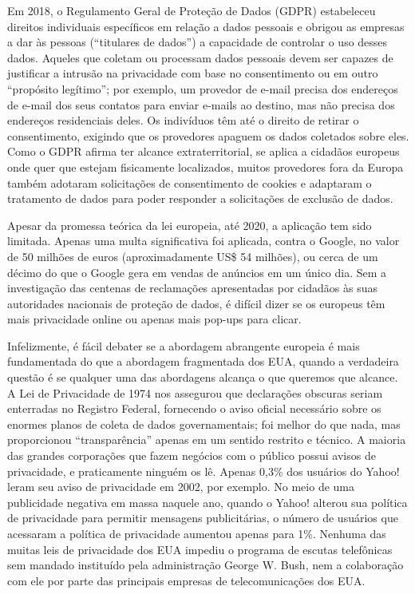 \documentclass{book}
\begin{document}
Em 2018, o Regulamento Geral de Proteção de Dados (GDPR) estabeleceu direitos
individuais específicos em relação a dados pessoais e obrigou as empresas a dar às
pessoas (``titulares de dados'') a capacidade de controlar o uso desses dados.
Aqueles que coletam ou processam dados pessoais devem ser capazes de justificar a
intrusão na privacidade com base no consentimento ou em outro ``propósito legítimo'';
por exemplo, um provedor de e-mail precisa dos endereços de e-mail dos seus contatos
para enviar e-mails ao destino, mas não precisa dos endereços residenciais deles.
Os indivíduos têm até o direito de retirar o consentimento, exigindo que os
provedores apaguem os dados coletados sobre eles. Como o GDPR afirma ter alcance
extraterritorial, se aplica a cidadãos europeus onde quer que estejam fisicamente
localizados, muitos provedores fora da Europa também adotaram solicitações de
consentimento de cookies e adaptaram o tratamento de dados para poder responder
a solicitações de exclusão de dados.

Apesar da promessa teórica da lei europeia, até 2020, a aplicação tem sido
limitada. Apenas uma multa significativa foi aplicada, contra o Google, no valor
de 50 milhões de euros (aproximadamente US\$ 54 milhões), ou cerca de um décimo
do que o Google gera em vendas de anúncios em um único dia. Sem a investigação
das centenas de reclamações apresentadas por cidadãos às suas autoridades
nacionais de proteção de dados, é difícil dizer se os europeus têm mais 
privacidade online ou apenas mais pop-ups para clicar.

Infelizmente, é fácil debater se a abordagem abrangente europeia é mais
fundamentada do que a abordagem fragmentada dos EUA, quando a verdadeira questão
é se qualquer uma das abordagens alcança o que queremos que alcance. A Lei de
Privacidade de 1974 nos assegurou que declarações obscuras seriam enterradas 
no Registro Federal, fornecendo o aviso oficial necessário sobre os enormes
planos de coleta de dados governamentais; foi melhor do que nada, mas proporcionou
``transparência'' apenas em um sentido restrito e técnico. A maioria das grandes
corporações que fazem negócios com o público possui avisos de privacidade, e
praticamente ninguém os lê. Apenas 0,3\% dos usuários do Yahoo! leram seu aviso
de privacidade em 2002, por exemplo. No meio de uma publicidade negativa em
massa naquele ano, quando o Yahoo! alterou sua política de privacidade para
permitir mensagens publicitárias, o número de usuários que acessaram a política
de privacidade aumentou apenas para 1\%. Nenhuma das muitas leis de privacidade
dos EUA impediu o programa de escutas telefônicas sem mandado instituído pela
administração George W. Bush, nem a colaboração com ele por parte das principais
empresas de telecomunicações dos EUA.
\end{document}
